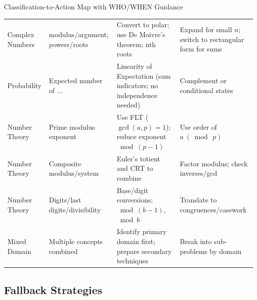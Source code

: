 \documentclass{article}
\begin{document}
\begin{classifybox}{Classification-to-Action Map with WHO/WHEN Guidance}
\begin{center}
\begin{tabularx}{\textwidth}{|>{\raggedright\arraybackslash}X|>{\raggedright\arraybackslash}X|>{\raggedright\arraybackslash}X|>{\raggedright\arraybackslash}X|}
Complex Numbers & modulus/argument; powers/roots & Convert to polar; use De Moivre's theorem; nth roots & Expand for small $n$; switch to rectangular form for sums \\
Probability & Expected number of ... & Linearity of Expectation (sum indicators; no independence needed) & Complement or conditional states \\
Number Theory & Prime modulus exponent & Use FLT ($\gcd(a,p)=1$); reduce exponent $\bmod (p{-}1)$ & Use order of $a\ (\bmod\ p)$ \\
Number Theory & Composite modulus/system & Euler's totient and CRT to combine & Factor modulus; check inverses/gcd \\
Number Theory & Digits/last digits/divisibility & Base/digit conversions; $\bmod (b{-}1)$, $\bmod b$ & Translate to congruences/casework \\
Mixed Domain & Multiple concepts combined & Identify primary domain first; prepare secondary techniques & Break into sub-problems by domain \\

\hline
\end{tabularx}
\end{center}
\end{classifybox}


\subsection{Fallback Strategies}
\end{document}
